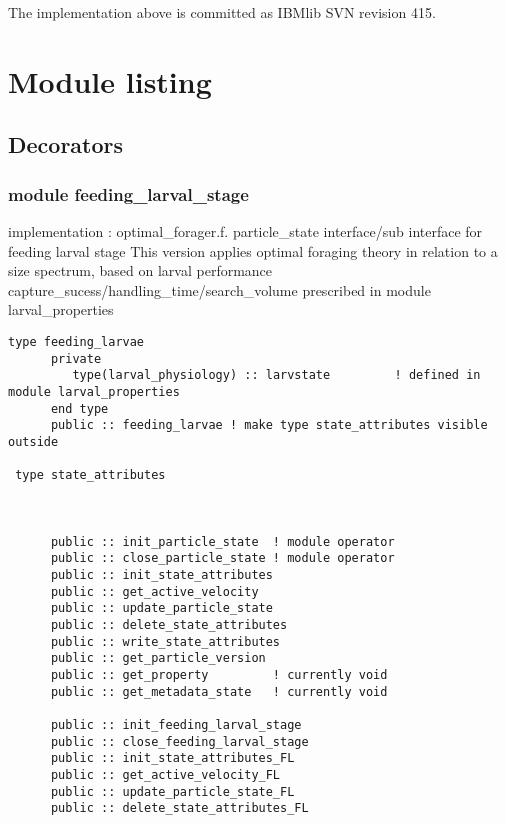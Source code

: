 The implementation above is committed as IBMlib SVN revision 415.



\section{Module listing } 

\subsection{Decorators} 

\subsubsection{module feeding\_larval\_stage}                                     
implementation : optimal\_forager.f.
particle\_state interface/sub interface for feeding larval stage  
This version applies optimal foraging theory in relation to a size spectrum, based
on larval performance capture\_sucess/handling\_time/search\_volume
prescribed in module larval\_properties 

\begin{verbatim}
type feeding_larvae
      private
         type(larval_physiology) :: larvstate         ! defined in module larval_properties 
      end type
      public :: feeding_larvae ! make type state_attributes visible outside

 type state_attributes



      public :: init_particle_state  ! module operator
      public :: close_particle_state ! module operator
      public :: init_state_attributes
      public :: get_active_velocity
      public :: update_particle_state
      public :: delete_state_attributes 
      public :: write_state_attributes
      public :: get_particle_version
      public :: get_property         ! currently void
      public :: get_metadata_state   ! currently void

      public :: init_feeding_larval_stage
      public :: close_feeding_larval_stage
      public :: init_state_attributes_FL
      public :: get_active_velocity_FL
      public :: update_particle_state_FL
      public :: delete_state_attributes_FL
\end{verbatim}

